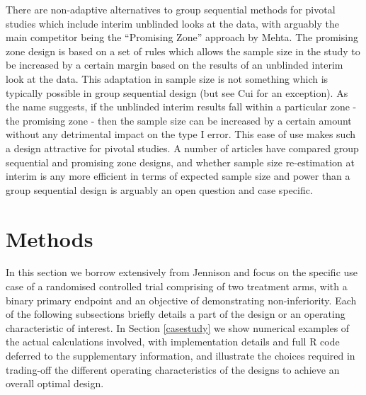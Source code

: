 \documentclass{article}
\begin{document}
There are non-adaptive alternatives to group sequential methods for pivotal studies which include interim unblinded looks at the data, with arguably the main competitor being the ``Promising Zone'' approach by Mehta\citep{Mehta:2011aa,Mehta:2016aa}. The promising zone design is based on a set of rules which allows the sample size in the study to be increased by a certain margin based on the results of an unblinded interim look at the data. This adaptation in sample size is not something which is typically possible in group sequential design (but see Cui\citep{Cui:1999aa} for an exception). As the name suggests, if the unblinded interim results fall within a particular zone - the promising zone - then the sample size can be increased by a certain amount without any detrimental impact on the type I error. This ease of use makes such a design attractive for pivotal studies. A number of articles have compared group sequential and promising zone designs\citep{Jennison:2015aa,Edwards:2020aa}, and whether sample size re-estimation at interim is any more efficient in terms of expected sample size and power than a group sequential design is arguably an open question and case specific. 



\section{Methods}
In this section we borrow extensively from Jennison\citep{Jennison:2000aa} and focus on the specific use case of a randomised controlled trial comprising of two treatment arms, with a binary primary endpoint and an objective of demonstrating non-inferiority. Each of the following subsections briefly details a part of the design or an operating characteristic of interest. In Section \ref{casestudy} we show numerical examples of the actual calculations involved, with implementation details and full R code deferred to the supplementary information, and illustrate the choices required in trading-off the different operating characteristics of the designs to achieve an overall optimal design. 
\end{document}
